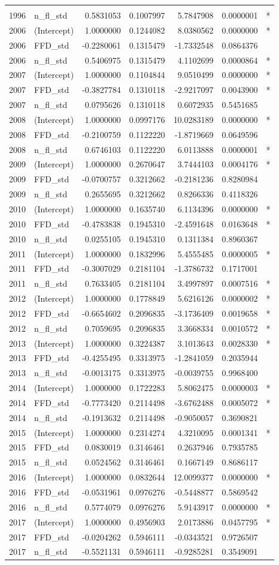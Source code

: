 \documentclass[]{article}
\begin{document}
\begin{longtable}[]{@{}llrrrrl@{}}
&\tabularnewline
1996 & n\_fl\_std & 0.5831053 & 0.1007997 & 5.7847908 & 0.0000001 &
*\tabularnewline
2006 & (Intercept) & 1.0000000 & 0.1244082 & 8.0380562 & 0.0000000 &
*\tabularnewline
2006 & FFD\_std & -0.2280061 & 0.1315479 & -1.7332548 & 0.0864376
&\tabularnewline
2006 & n\_fl\_std & 0.5406975 & 0.1315479 & 4.1102699 & 0.0000864 &
*\tabularnewline
2007 & (Intercept) & 1.0000000 & 0.1104844 & 9.0510499 & 0.0000000 &
*\tabularnewline
2007 & FFD\_std & -0.3827784 & 0.1310118 & -2.9217097 & 0.0043900 &
*\tabularnewline
2007 & n\_fl\_std & 0.0795626 & 0.1310118 & 0.6072935 & 0.5451685
&\tabularnewline
2008 & (Intercept) & 1.0000000 & 0.0997176 & 10.0283189 & 0.0000000 &
*\tabularnewline
2008 & FFD\_std & -0.2100759 & 0.1122220 & -1.8719669 & 0.0649596
&\tabularnewline
2008 & n\_fl\_std & 0.6746103 & 0.1122220 & 6.0113888 & 0.0000001 &
*\tabularnewline
2009 & (Intercept) & 1.0000000 & 0.2670647 & 3.7444103 & 0.0004176 &
*\tabularnewline
2009 & FFD\_std & -0.0700757 & 0.3212662 & -0.2181236 & 0.8280984
&\tabularnewline
2009 & n\_fl\_std & 0.2655695 & 0.3212662 & 0.8266336 & 0.4118326
&\tabularnewline
2010 & (Intercept) & 1.0000000 & 0.1635740 & 6.1134396 & 0.0000000 &
*\tabularnewline
2010 & FFD\_std & -0.4783838 & 0.1945310 & -2.4591648 & 0.0163648 &
*\tabularnewline
2010 & n\_fl\_std & 0.0255105 & 0.1945310 & 0.1311384 & 0.8960367
&\tabularnewline
2011 & (Intercept) & 1.0000000 & 0.1832996 & 5.4555485 & 0.0000005 &
*\tabularnewline
2011 & FFD\_std & -0.3007029 & 0.2181104 & -1.3786732 & 0.1717001
&\tabularnewline
2011 & n\_fl\_std & 0.7633405 & 0.2181104 & 3.4997897 & 0.0007516 &
*\tabularnewline
2012 & (Intercept) & 1.0000000 & 0.1778849 & 5.6216126 & 0.0000002 &
*\tabularnewline
2012 & FFD\_std & -0.6654602 & 0.2096835 & -3.1736409 & 0.0019658 &
*\tabularnewline
2012 & n\_fl\_std & 0.7059695 & 0.2096835 & 3.3668334 & 0.0010572 &
*\tabularnewline
2013 & (Intercept) & 1.0000000 & 0.3224387 & 3.1013643 & 0.0028330 &
*\tabularnewline
2013 & FFD\_std & -0.4255495 & 0.3313975 & -1.2841059 & 0.2035944
&\tabularnewline
2013 & n\_fl\_std & -0.0013175 & 0.3313975 & -0.0039755 & 0.9968400
&\tabularnewline
2014 & (Intercept) & 1.0000000 & 0.1722283 & 5.8062475 & 0.0000003 &
*\tabularnewline
2014 & FFD\_std & -0.7773420 & 0.2114498 & -3.6762488 & 0.0005072 &
*\tabularnewline
2014 & n\_fl\_std & -0.1913632 & 0.2114498 & -0.9050057 & 0.3690821
&\tabularnewline
2015 & (Intercept) & 1.0000000 & 0.2314274 & 4.3210095 & 0.0001341 &
*\tabularnewline
2015 & FFD\_std & 0.0830019 & 0.3146461 & 0.2637946 & 0.7935785
&\tabularnewline
2015 & n\_fl\_std & 0.0524562 & 0.3146461 & 0.1667149 & 0.8686117
&\tabularnewline
2016 & (Intercept) & 1.0000000 & 0.0832644 & 12.0099377 & 0.0000000 &
*\tabularnewline
2016 & FFD\_std & -0.0531961 & 0.0976276 & -0.5448877 & 0.5869542
&\tabularnewline
2016 & n\_fl\_std & 0.5774079 & 0.0976276 & 5.9143917 & 0.0000000 &
*\tabularnewline
2017 & (Intercept) & 1.0000000 & 0.4956903 & 2.0173886 & 0.0457795 &
*\tabularnewline
2017 & FFD\_std & -0.0204262 & 0.5946111 & -0.0343521 & 0.9726507
&\tabularnewline
2017 & n\_fl\_std & -0.5521131 & 0.5946111 & -0.9285281 & 0.3549091
&\tabularnewline
\bottomrule
\end{longtable}
\end{document}
